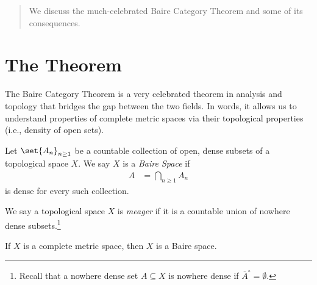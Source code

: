\documentclass[10pt]{mypackage}
\begin{document}
\RaggedRight
\begin{abstract}
  \noindent We discuss the much-celebrated Baire Category Theorem and some of its consequences.
\end{abstract}
\section{The Theorem}%
The Baire Category Theorem is a very celebrated theorem in analysis and topology that bridges the gap between the two fields. In words, it allows us to understand properties of complete metric spaces via their topological properties (i.e., density of open sets).
\begin{definition}
Let $\set{A_n}_{n\geq 1}$ be a countable collection of open, dense subsets of a topological space $X$. We say $X$ is a \textit{Baire Space} if
\begin{align*}
A &= \bigcap_{n\geq 1}A_n
\end{align*}
is dense for every such collection.
\end{definition}
\begin{definition}
We say a topological space $X$ is \textit{meager} if it is a countable union of nowhere dense subsets.\footnote{Recall that a nowhere dense set $A\subseteq X$ is nowhere dense if $\overline{A}^{\circ} = \emptyset$.}
\end{definition}
\begin{theorem}
  If $X$ is a complete metric space, then $X$ is a Baire space.
\end{theorem}
\end{document}
